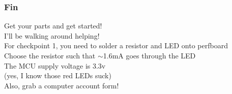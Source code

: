 \documentclass{beamer}
\begin{document}
\begin{frame}
\frametitle{Fin}
\begin{center}
Get your parts and get started! \\
\vspace{5px}
{\tiny I'll be walking around helping!} \\
\vspace{20px}
For checkpoint 1, you need to solder a resistor and LED onto perfboard \\
Choose the resistor such that $\sim$1.6mA goes through the LED \\
The MCU supply voltage is 3.3v \\
\vspace{5px}
{\tiny (yes, I know those red LEDs suck)} \\
\vspace{20px}
Also, grab a computer account form!
\end{center}
\end{frame}
\end{document}
